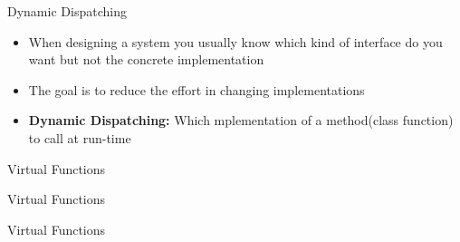 \begin{frame}{Dynamic Dispatching}
    \begin{itemize}
        \item When designing a system you usually know which kind of interface
            do you want but not the concrete implementation
        \item The goal is to reduce the effort in changing implementations
        \item \textbf{Dynamic Dispatching:} Which mplementation of a 
            method(class function) to call at run-time
    \end{itemize}
\end{frame}

\begin{frame}{Virtual Functions}
    \begin{center}
    \end{center}
\end{frame}

\begin{frame}{Virtual Functions}
    \begin{center}
    \end{center}
\end{frame}

\begin{frame}{Virtual Functions}
    \begin{center}
    \end{center}
\end{frame}

